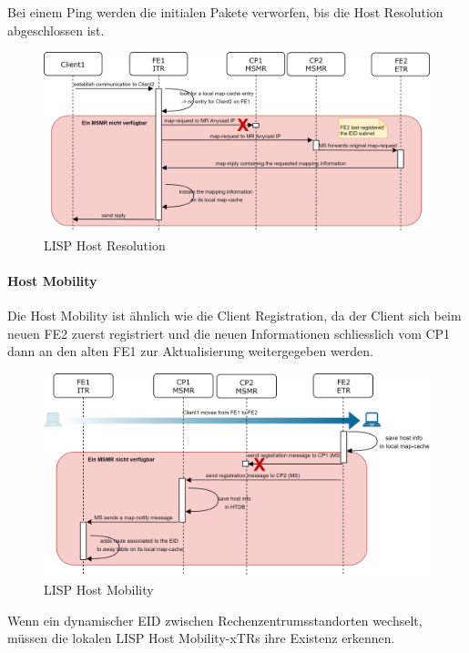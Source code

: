 Bei einem Ping werden die initialen Pakete verworfen, bis die Host Resolution abgeschlossen ist. 

\begin{figure}[H]
	\centering
	\includegraphics[width=1\linewidth]{img/Absicherung/LISP-HostResolution-Fail}
	\caption{LISP Host Resolution}
	\label{fig:LISP Host Resolution}
\end{figure}

\paragraph{Host Mobility}
Die Host Mobility ist ähnlich wie die Client Registration, da der Client sich beim neuen FE2 zuerst registriert und die neuen Informationen schliesslich vom CP1 dann an den alten FE1 zur Aktualisierung weitergegeben werden.

\begin{figure}[H]
	\centering
	\includegraphics[width=1\linewidth]{img/Absicherung/LISP-HostMobility-Fail}
	\caption{LISP Host Mobility}
	\label{fig:LISP Host Mobility}
\end{figure}

Wenn ein dynamischer EID zwischen Rechenzentrumsstandorten wechselt, müssen die lokalen LISP Host Mobility-xTRs ihre Existenz erkennen. 

